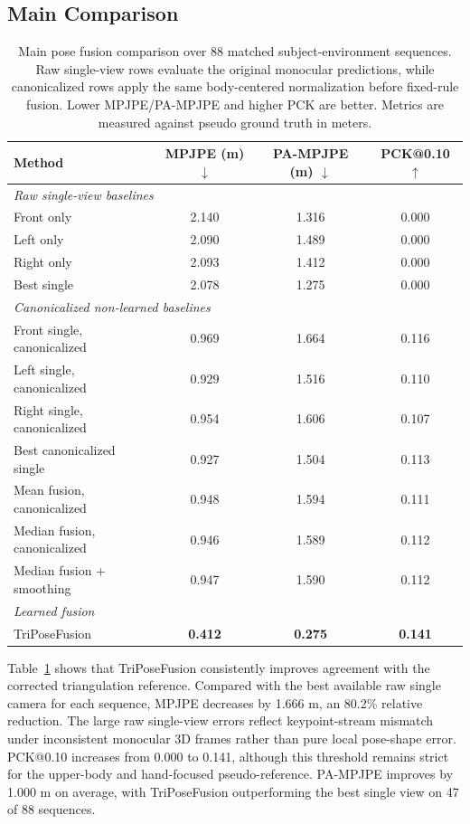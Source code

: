 \documentclass[runningheads]{llncs}
\begin{document}
\subsection{Main Comparison}
\begin{table}[t]
\centering
\caption{Main pose fusion comparison over 88 matched subject-environment sequences. Raw single-view rows evaluate the original monocular predictions, while canonicalized rows apply the same body-centered normalization before fixed-rule fusion. Lower MPJPE/PA-MPJPE and higher PCK are better. Metrics are measured against pseudo ground truth in meters.}
\label{tab:main_pose}
\scriptsize
\setlength{\tabcolsep}{2.5pt}
\begin{tabular}{lccc}
\hline
Method & MPJPE (m) $\downarrow$ & PA-MPJPE (m) $\downarrow$ & PCK@0.10 $\uparrow$ \\
\hline
\multicolumn{4}{l}{\emph{Raw single-view baselines}} \\
Front only & 2.140 & 1.316 & 0.000 \\
Left only & 2.090 & 1.489 & 0.000 \\
Right only & 2.093 & 1.412 & 0.000 \\
Best single & 2.078 & 1.275 & 0.000 \\
\hline
\multicolumn{4}{l}{\emph{Canonicalized non-learned baselines}} \\
Front single, canonicalized & 0.969 & 1.664 & 0.116 \\
Left single, canonicalized & 0.929 & 1.516 & 0.110 \\
Right single, canonicalized & 0.954 & 1.606 & 0.107 \\
Best canonicalized single & 0.927 & 1.504 & 0.113 \\
Mean fusion, canonicalized & 0.948 & 1.594 & 0.111 \\
Median fusion, canonicalized & 0.946 & 1.589 & 0.112 \\
Median fusion + smoothing & 0.947 & 1.590 & 0.112 \\
\hline
\multicolumn{4}{l}{\emph{Learned fusion}} \\
TriPoseFusion & \textbf{0.412} & \textbf{0.275} & \textbf{0.141} \\
\hline
\end{tabular}
\end{table}

Table~\ref{tab:main_pose} shows that TriPoseFusion consistently improves agreement with the corrected triangulation reference. Compared with the best available raw single camera for each sequence, MPJPE decreases by 1.666 m, an 80.2\% relative reduction. The large raw single-view errors reflect keypoint-stream mismatch under inconsistent monocular 3D frames rather than pure local pose-shape error. PCK@0.10 increases from 0.000 to 0.141, although this threshold remains strict for the upper-body and hand-focused pseudo-reference. PA-MPJPE improves by 1.000 m on average, with TriPoseFusion outperforming the best single view on 47 of 88 sequences.
\end{document}
